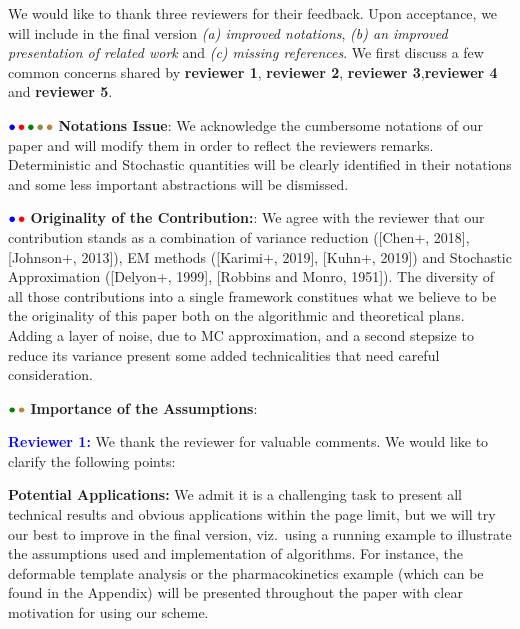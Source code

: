 \documentclass{article}
\begin{document}
We would like to thank three reviewers for their feedback. Upon acceptance, we will include in the final version \emph{{\sf (a)} improved notations}, \emph{{\sf (b)} an improved presentation of related work} and \emph{{\sf (c)} missing references}. 
We first discuss a few common concerns shared by \textbf{\color{blue}reviewer 1}, \textbf{\color{red} reviewer 2}, \textbf{\color{green!50!black}reviewer 3},\textbf{\color{yellow!50!black}reviewer 4} and \textbf{\color{brown}reviewer 5}.

${\color{blue}\bullet}\!~{\color{red}\bullet}\!~{\color{green!50!black}\bullet}\!~{\color{yellow!50!black}\bullet}\!~{\color{brown}\bullet}$ \textbf{Notations Issue}: 
We acknowledge the cumbersome notations of our paper and will modify them in order to reflect the reviewers remarks. 
Deterministic and Stochastic quantities will be clearly identified in their notations and some less important abstractions will be dismissed.


${\color{blue}\bullet}\!~{\color{red}\bullet}$ \textbf{Originality of the Contribution:}: We agree with the reviewer that our contribution stands as a combination of variance reduction ([Chen+, 2018], [Johnson+, 2013]), EM methods ([Karimi+, 2019], [Kuhn+, 2019]) and Stochastic Approximation ([Delyon+, 1999], [Robbins and Monro, 1951]). 
The diversity of all those contributions into a single framework constitues what we believe to be the originality of this paper both on the algorithmic and theoretical plans.
Adding a layer of noise, due to MC approximation, and a second stepsize to reduce its variance present some added technicalities that need careful consideration.


${\color{green!50!black}\bullet}\!~{\color{brown}\bullet}$ \textbf{Importance of the Assumptions}: 



\textbf{\textcolor{blue}{Reviewer 1:}} We thank the reviewer for valuable comments. We would like to clarify the following points:

\textbf{Potential Applications:} We admit it is a challenging task to present all technical results and obvious applications within the page limit, but we will try our best to improve in the final version, viz.~using a running example to illustrate the assumptions used and implementation of algorithms. For instance, the deformable template analysis or the pharmacokinetics example (which can be found in the Appendix) will be presented throughout the paper with clear motivation for using our scheme.
\end{document}
